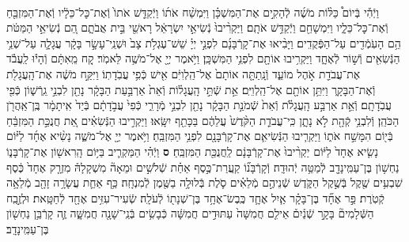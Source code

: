 \documentclass[twoside, openany, parskip=half, 11pt]{book}
\begin{document}
\begin{footnotesize}
\begin{multicols}{2}
\\
וַיְֿהִ֡י בְּֿיוֹם֩ כַּלּ֨וֹת מֹשֶׁ֜ה לְֿהָקִ֣ים אֶת־הַמִּשְׁכָּ֗ן וַיִּמְשַׁ֨ח אֹת֜וֹ וַיְֿקַדֵּ֤שׁ אֹתוֹ֙ וְֿאֶת־כׇּל־כֵּלָ֔יו וְֿאֶת־הַמִּזְבֵּ֖חַ וְֿאֶת־כׇּל־כֵּלָ֑יו וַיִּמְשָׁחֵ֖ם וַיְֿקַדֵּ֥שׁ אֹתָֽם׃ וַיַּקְרִ֨יבוּ֙ נְֿשִׂיאֵ֣י יִשְׂרָאֵ֔ל רָאשֵׁ֖י בֵּ֣ית אֲבֹתָ֑ם הֵ֚ם נְֿשִׂיאֵ֣י הַמַּטֹּ֔ת הֵ֥ם הָעֹֽמְֿדִ֖ים עַל־הַפְּֿקֻדִֽים׃ וַיָּבִ֨יאוּ אֶת־קָרְֿבָּנָ֜ם לִפְנֵ֣י יְיָ֗ שֵׁשׁ־עֶגְלֹ֥ת צָב֙ וּשְׁנֵֽי־עָשָׂ֣ר בָּקָ֔ר עֲגָלָ֛ה עַל־שְׁנֵ֥י הַנְּֿשִׂאִ֖ים וְֿשׁ֣וֹר לְֿאֶחָ֑ד וַיַּקְרִ֥יבוּ אוֹתָ֖ם לִפְנֵ֥י הַמִּשְׁכָּֽן׃ 
וַיֹּ֥אמֶר יְיָ֖ אֶל־מֹשֶׁ֥ה לֵּאמֹֽר׃ קַ֚ח מֵֽאִתָּ֔ם וְֿהָי֕וּ לַֽעֲבֹ֕ד אֶת־עֲבֹדַ֖ת אֹ֣הֶל מוֹעֵ֑ד וְֿנָֽתַתָּ֤ה אוֹתָם֙ אֶל־הַֽלְוִיִּ֔ם אִ֖ישׁ כְּֿפִ֥י עֲבֹֽדָתֽוֹ׃ וַיִּקַּ֣ח מֹשֶׁ֔ה אֶת־הָֽעֲגָלֹ֖ת וְֿאֶת־הַבָּקָ֑ר וַיִּתֵּ֥ן אוֹתָ֖ם אֶל־הַֽלְוִיִּֽם׃ אֵ֣ת שְֿׁתֵּ֣י הָֽעֲגָל֗וֹת וְֿאֵת֙ אַרְבַּ֣עַת הַבָּקָ֔ר נָתַ֖ן לִבְנֵ֣י גֵֽרְֿשׁ֑וֹן כְּֿפִ֖י עֲבֹֽדָתָֽם׃ וְֿאֵ֣ת אַרְבַּ֣ע הָֽעֲגָלֹ֗ת וְֿאֵת֙ שְֿׁמֹנַ֣ת הַבָּקָ֔ר נָתַ֖ן לִבְנֵ֣י מְֿרָרִ֑י כְּֿפִי֙ עֲבֹ֣דָתָ֔ם בְּֿיַד֙ אִֽיתָמָ֔ר בֶּֽן־אַֽהֲרֹ֖ן הַכֹּהֵֽן׃ וְֿלִבְנֵ֥י קְֿהָ֖ת לֹ֣א נָתָ֑ן כִּֽי־עֲבֹדַ֤ת הַקֹּ֨דֶשׁ֙ עֲלֵהֶ֔ם בַּכָּתֵ֖ף יִשָּֽׂאוּ׃ וַיַּקְרִ֣יבוּ הַנְּֿשִׂאִ֗ים אֵ֚ת חֲנֻכַּ֣ת הַמִּזְבֵּ֔חַ בְּֿי֖וֹם הִמָּשַׁ֣ח אֹת֑וֹ וַיַּקְרִ֧יבוּ הַנְּֿשִׂיאִ֛ם אֶת־קָרְֿבָּנָ֖ם לִפְנֵ֥י הַמִּזְבֵּֽחַ׃ וַיֹּ֥אמֶר יְיָ֖ אֶל־מֹשֶׁ֑ה נָשִׂ֨יא אֶחָ֜ד לַיּ֗וֹם נָשִׂ֤יא אֶחָד֙ לַיּ֔וֹם יַקְרִ֨יבוּ֙ אֶת־קָרְֿבָּנָ֔ם לַֽחֲנֻכַּ֖ת הַמִּזְבֵּֽחַ׃ \textbf{ס}  
וַיְֿהִ֗י הַמַּקְרִ֛יב בַּיּ֥וֹם הָֽרִאשׁ֖וֹן אֶת־קָרְֿבָּנ֑וֹ נַחְשׁ֥וֹן בֶּן־עַמִּֽינָדָ֖ב לְֿמַטֵּ֥ה יְֿהוּדָֽה׃ וְֿקָרְֿבָּנ֞וֹ קַֽעֲרַת־כֶּ֣סֶף אַחַ֗ת שְֿׁלֹשִׁ֣ים וּמֵאָה֘ מִשְׁקָלָהּ֒ מִזְרָ֤ק אֶחָד֙ כֶּ֔סֶף שִׁבְעִ֥ים שֶׁ֖קֶל בְּֿשֶׁ֣קֶל הַקֹּ֑דֶשׁ שְֿׁנֵיהֶ֣ם מְֿלֵאִ֗ים סֹ֛לֶת בְּֿלוּלָ֥ה בַשֶּׁ֖מֶן לְֿמִנְחָֽה׃ כַּ֥ף אַחַ֛ת עֲשָׂרָ֥ה זָהָ֖ב מְֿלֵאָ֥ה קְֿטֹֽרֶת׃
פַּ֣ר אֶחָ֞ד בֶּן־בָּקָ֗ר אַ֧יִל אֶחָ֛ד כֶּֽבֶשׂ־אֶחָ֥ד בֶּן־שְׁנָת֖וֹ לְֿעֹלָֽה׃ שְֿׂעִיר־עִזִּ֥ים אֶחָ֖ד לְֿחַטָּֽאת׃ וּלְזֶ֣בַֽח הַשְּֿׁלָמִים֘ בָּקָ֣ר שְֿׁנַ֒יִם֒ אֵילִ֤ם חֲמִשָּׁה֙ עַתּוּדִ֣ים חֲמִשָּׁ֔ה כְּֿבָשִׂ֥ים בְּֿנֵֽי־שָׁנָ֖ה חֲמִשָּׁ֑ה זֶ֛ה קָרְֿבַּ֥ן נַחְשׁ֖וֹן בֶּן־עַמִּֽינָדָֽב׃



\end{multicols}
\end{footnotesize}
\end{document}
